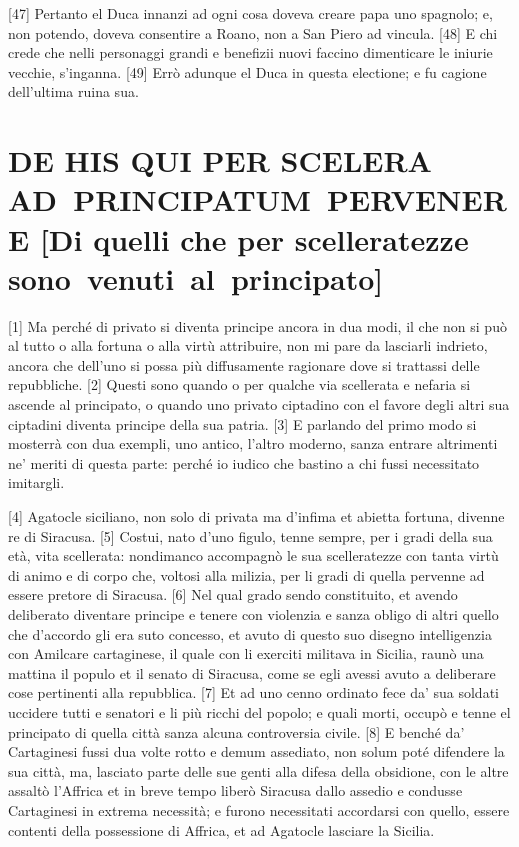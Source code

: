 {[}47{]} Pertanto el Duca innanzi ad ogni cosa doveva creare papa uno
spagnolo; e, non potendo, doveva consentire a Roano, non a San Piero ad
vincula. {[}48{]} E chi crede che nelli personaggi grandi e benefizii
nuovi faccino dimenticare le iniurie vecchie, s'inganna. {[}49{]} Errò
adunque el Duca in questa electione; e fu cagione dell'ultima ruina sua.

\quebra\section{DE HIS QUI PER SCELERA AD~PRINCIPATUM~PERVENERE\break
{[}Di quelli che per scelleratezze sono~venuti~al~principato{]}}

{[}1{]} Ma perché di privato si diventa principe ancora in dua modi, il
che non si può al tutto o alla fortuna o alla virtù attribuire, non mi
pare da lasciarli indrieto, ancora che dell'uno si possa più
diffusamente ragionare dove si trattassi delle repubbliche. {[}2{]}
Questi sono quando o per qualche via scellerata e nefaria si ascende al
principato, o quando uno privato ciptadino con el favore degli altri sua
ciptadini diventa principe della sua patria. {[}3{]} E parlando del
primo modo si mosterrà con dua exempli, uno antico, l'altro moderno,
sanza entrare altrimenti ne' meriti di questa parte: perché io iudico
che bastino a chi fussi necessitato imitargli.

{[}4{]} Agatocle siciliano, non solo di privata ma d'infima et abietta
fortuna, divenne re di Siracusa. {[}5{]} Costui, nato d'uno figulo,
tenne sempre, per i gradi della sua età, vita scellerata: nondimanco
accompagnò le sua scelleratezze con tanta virtù di animo e di corpo che,
voltosi alla milizia, per li gradi di quella pervenne ad essere pretore
di Siracusa. {[}6{]} Nel qual grado sendo constituito, et avendo
deliberato diventare principe e tenere con violenzia e sanza obligo di
altri quello che d'accordo gli era suto concesso, et avuto di questo suo
disegno intelligenzia con Amilcare cartaginese, il quale con li exerciti
militava in Sicilia, raunò una mattina il populo et il senato di
Siracusa, come se egli avessi avuto a deliberare cose pertinenti alla
repubblica. {[}7{]} Et ad uno cenno ordinato fece da' sua soldati
uccidere tutti e senatori e li più ricchi del popolo; e quali morti,
occupò e tenne el principato di quella città sanza alcuna controversia
civile. {[}8{]} E benché da' Cartaginesi fussi dua volte rotto e demum
assediato, non solum poté difendere la sua città, ma, lasciato parte
delle sue genti alla difesa della obsidione, con le altre assaltò
l'Affrica et in breve tempo liberò Siracusa dallo assedio e condusse
Cartaginesi in extrema necessità; e furono necessitati accordarsi con
quello, essere contenti della possessione di Affrica, et ad Agatocle
lasciare la Sicilia.

